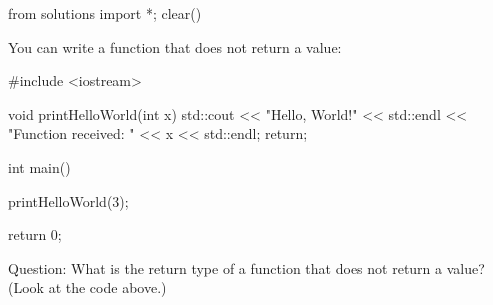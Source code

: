 \begin{python0}
from solutions import *; clear()
\end{python0}

You can write a function that does not return a value:

\begin{consolethree}[escapeinside=||]
#include <iostream>

void printHelloWorld(int x)
{
    std::cout << "Hello, World!" << std::endl
              << "Function received: "
              << x
              << std::endl;
    return;
}

int main()
{
    printHelloWorld(3);

    return 0;
}
\end{consolethree}

Question: What is the return type of a function that does not return a value? (Look at the code above.)







